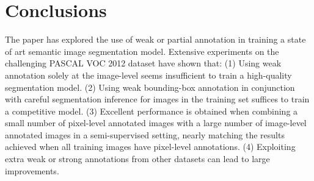 \section{Conclusions}

The paper has explored the use of weak or partial annotation
in training a state of art semantic image segmentation
model. Extensive experiments on the challenging PASCAL VOC 2012
dataset have shown that: (1) Using weak annotation solely at the
image-level seems insufficient to train a high-quality segmentation
model. (2) Using weak bounding-box annotation in conjunction with
careful segmentation inference for images in the training set suffices
to train a competitive model. (3) Excellent performance is obtained when
combining a small number of pixel-level annotated images with a large
number of image-level annotated images in a semi-supervised setting,
nearly matching the results achieved when all training images have
pixel-level annotations. (4) Exploiting extra weak or strong
annotations from other datasets can lead to large improvements.

